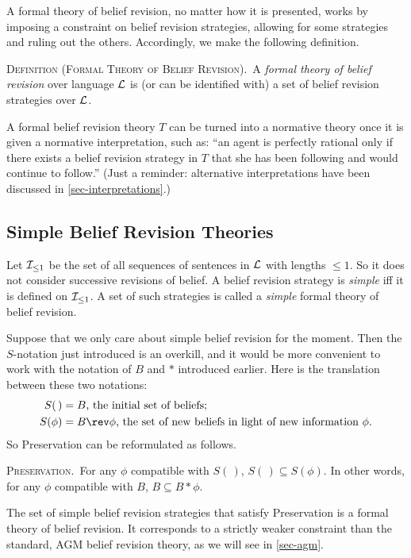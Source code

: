 A formal theory of belief revision, no matter how it is presented, works by imposing a constraint on belief revision strategies, allowing for some strategies and ruling out the others. Accordingly, we make the following definition. \op

	\xm \textsc{Definition (Formal Theory of Belief Revision).}\, A {\em formal theory of belief revision} over language ${\cal L}$ is (or can be identified with) a set of belief revision strategies over ${\cal L}$. 

\ed A formal belief revision theory $T$ can be turned into a normative theory once it is given a normative interpretation, such as: ``an agent is perfectly rational only if there exists a belief revision strategy in $T$ that she has been following and would continue to follow.'' (Just a reminder: alternative interpretations have been discussed in \autoref{sec-interpretations}.)

\subsection{Simple Belief Revision Theories}

Let ${\cal I}_{\le 1}$ be the set of all sequences of sentences in ${\cal L}$ with lengths $\leq 1$. So it does not consider successive revisions of belief. A belief revision strategy is {\em simple} iff it is defined on ${\cal I}_{\le 1}$. A set of such strategies is called a {\em simple} formal theory of belief revision.

Suppose that we only care about simple belief revision for the moment. Then the $S$-notation just introduced is an overkill, and it would be more convenient to work with the notation of $B$ and $*$ introduced earlier. Here is the translation between these two notations:
$$
  \begin{aligned}
	S(\,)   &= \text{$B$, the initial set of beliefs;}\\
	S(\phi) &= \text{$B \rev \phi$, the set of new beliefs in light of new information $\phi$.}
  \end{aligned}
$$
So Preservation can be reformulated as follows. \op

	\xm \textsc{Preservation.}\,  For any $\phi$ compatible with $S(\,)$, $S(\,) \subseteq S(\phi)$.
	In other words, for any $\phi$ compatible with $B$, $B \subseteq B * \phi$.

\ed The set of simple belief revision strategies that satisfy Preservation is a formal theory of belief revision. It corresponds to a strictly weaker constraint than the standard, AGM belief revision theory, as we will see in \autoref{sec-agm}.


